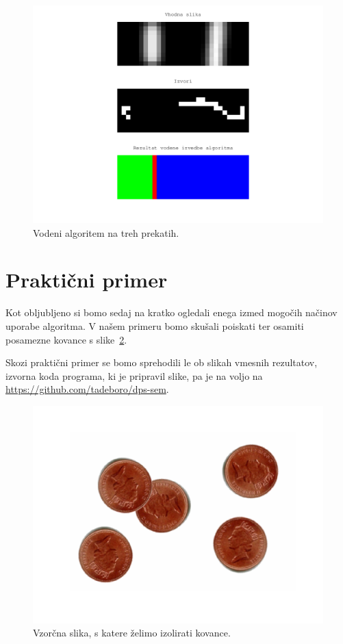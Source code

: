\documentclass[a4paper, 11pt]{article}
\begin{document}
\begin{figure}
  \centering
  \includegraphics[width=.8\textwidth]{t4-seed-2-result}
  \caption{Vodeni algoritem na treh prekatih.}
  \label{img:t4-seed-2-result}
\end{figure}


\section{Praktični primer}

Kot obljubljeno si bomo sedaj na kratko ogledali enega izmed mogočih načinov uporabe algoritma. V našem primeru bomo skušali poiskati ter osamiti posamezne kovance s slike~\ref{img:coins-input}.

Skozi praktični primer se bomo sprehodili le ob slikah vmesnih rezultatov, izvorna koda programa, ki je pripravil slike, pa je na voljo na \url{https://github.com/tadeboro/dps-sem}.

\begin{figure}[htb]
  \centering
  \includegraphics[width=.6\textwidth]{coins-input}
  \caption{Vzorčna slika, s katere želimo izolirati kovance.}
  \label{img:coins-input}
\end{figure}
\end{document}
